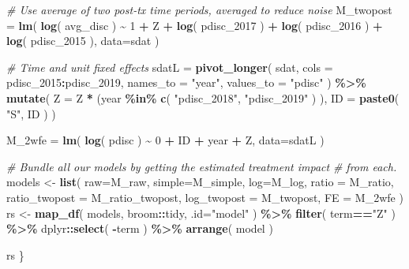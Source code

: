 \documentclass[
]{book}
\newenvironment{Shaded}{\begin{snugshade}}{\end{snugshade}}
\newcommand{\AttributeTok}[1]{\textcolor[rgb]{0.13,0.29,0.53}{#1}}
\newcommand{\CommentTok}[1]{\textcolor[rgb]{0.56,0.35,0.01}{\textit{#1}}}
\newcommand{\DecValTok}[1]{\textcolor[rgb]{0.00,0.00,0.81}{#1}}
\newcommand{\FunctionTok}[1]{\textcolor[rgb]{0.13,0.29,0.53}{\textbf{#1}}}
\newcommand{\NormalTok}[1]{#1}
\newcommand{\OtherTok}[1]{\textcolor[rgb]{0.56,0.35,0.01}{#1}}
\newcommand{\SpecialCharTok}[1]{\textcolor[rgb]{0.81,0.36,0.00}{\textbf{#1}}}
\newcommand{\StringTok}[1]{\textcolor[rgb]{0.31,0.60,0.02}{#1}}
\begin{document}
\begin{Shaded}
\begin{Highlighting}[]
    \CommentTok{\# Use average of two post{-}tx time periods, averaged to reduce noise}
\NormalTok{    M\_twopost }\OtherTok{=} \FunctionTok{lm}\NormalTok{( }\FunctionTok{log}\NormalTok{( avg\_disc ) }\SpecialCharTok{\textasciitilde{}} \DecValTok{1} \SpecialCharTok{+}\NormalTok{ Z }\SpecialCharTok{+} \FunctionTok{log}\NormalTok{( pdisc\_2017 ) }\SpecialCharTok{+} \FunctionTok{log}\NormalTok{( pdisc\_2016 ) }\SpecialCharTok{+} \FunctionTok{log}\NormalTok{( pdisc\_2015 ), }\AttributeTok{data=}\NormalTok{sdat )}

    \CommentTok{\# Time and unit fixed effects}
\NormalTok{    sdatL }\OtherTok{=} \FunctionTok{pivot\_longer}\NormalTok{( sdat, }\AttributeTok{cols =}\NormalTok{ pdisc\_2015}\SpecialCharTok{:}\NormalTok{pdisc\_2019, }
                          \AttributeTok{names\_to =} \StringTok{"year"}\NormalTok{,}
                          \AttributeTok{values\_to =} \StringTok{"pdisc"}\NormalTok{ ) }\SpecialCharTok{\%\textgreater{}\%}
        \FunctionTok{mutate}\NormalTok{( }\AttributeTok{Z =}\NormalTok{ Z }\SpecialCharTok{*}\NormalTok{ (year }\SpecialCharTok{\%in\%} \FunctionTok{c}\NormalTok{( }\StringTok{"pdisc\_2018"}\NormalTok{, }\StringTok{"pdisc\_2019"}\NormalTok{ ) ),}
                \AttributeTok{ID =} \FunctionTok{paste0}\NormalTok{( }\StringTok{"S"}\NormalTok{, ID ) )}
    
\NormalTok{    M\_2wfe }\OtherTok{=} \FunctionTok{lm}\NormalTok{( }\FunctionTok{log}\NormalTok{( pdisc ) }\SpecialCharTok{\textasciitilde{}} \DecValTok{0} \SpecialCharTok{+}\NormalTok{ ID }\SpecialCharTok{+}\NormalTok{ year }\SpecialCharTok{+}\NormalTok{ Z,}
                 \AttributeTok{data=}\NormalTok{sdatL )}

    \CommentTok{\# Bundle all our models by getting the estimated treatment impact}
    \CommentTok{\# from each.}
\NormalTok{    models }\OtherTok{\textless{}{-}} \FunctionTok{list}\NormalTok{( }\AttributeTok{raw=}\NormalTok{M\_raw, }\AttributeTok{simple=}\NormalTok{M\_simple,}
                       \AttributeTok{log=}\NormalTok{M\_log, }\AttributeTok{ratio =}\NormalTok{ M\_ratio, }
                       \AttributeTok{ratio\_twopost =}\NormalTok{ M\_ratio\_twopost,}
                       \AttributeTok{log\_twopost =}\NormalTok{ M\_twopost, }
                       \AttributeTok{FE =}\NormalTok{ M\_2wfe )}
\NormalTok{    rs }\OtherTok{\textless{}{-}} \FunctionTok{map\_df}\NormalTok{( models, broom}\SpecialCharTok{::}\NormalTok{tidy, }\AttributeTok{.id=}\StringTok{"model"}\NormalTok{ ) }\SpecialCharTok{\%\textgreater{}\%}
        \FunctionTok{filter}\NormalTok{( term}\SpecialCharTok{==}\StringTok{"Z"}\NormalTok{ ) }\SpecialCharTok{\%\textgreater{}\%}
\NormalTok{        dplyr}\SpecialCharTok{::}\FunctionTok{select}\NormalTok{( }\SpecialCharTok{{-}}\NormalTok{term ) }\SpecialCharTok{\%\textgreater{}\%}
      \FunctionTok{arrange}\NormalTok{( model )}
    
\NormalTok{    rs}
\NormalTok{\}}
\end{Highlighting}
\end{Shaded}
\end{document}
